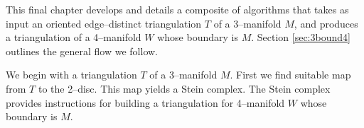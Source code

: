 This final chapter develops and details a composite of algorithms that takes as input an oriented edge--distinct triangulation $T$ of a 3--manifold $M$, and produces a triangulation of a 4--manifold $W$ whose boundary is $M$.
Section \ref{sec:3bound4} outlines the general flow we follow.

We begin with a triangulation $T$ of a 3--manifold $M$.
First we find suitable map from $T$ to the 2--disc.
This map yields a Stein complex.
The Stein complex provides instructions for building a triangulation for 4--manifold $W$ whose boundary is $M$.